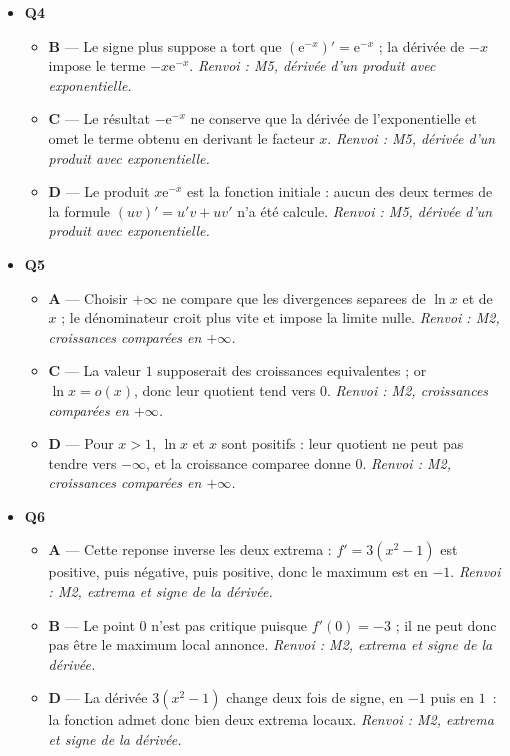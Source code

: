 \begin{itemize}
  \item \textbf{Q4}
  \begin{itemize}
    \item \textbf{B} — Le signe plus suppose a tort que $(\mathrm{e}^{-x})'=\mathrm{e}^{-x}$ ; la dérivée de $-x$ impose le terme $-x\mathrm{e}^{-x}$. \emph{Renvoi : M5, dérivée d'un produit avec exponentielle.}
    \item \textbf{C} — Le résultat $-\mathrm{e}^{-x}$ ne conserve que la dérivée de l'exponentielle et omet le terme obtenu en derivant le facteur $x$. \emph{Renvoi : M5, dérivée d'un produit avec exponentielle.}
    \item \textbf{D} — Le produit $x\mathrm{e}^{-x}$ est la fonction initiale : aucun des deux termes de la formule $(uv)'=u'v+uv'$ n'a été calcule. \emph{Renvoi : M5, dérivée d'un produit avec exponentielle.}
  \end{itemize}
  \item \textbf{Q5}
  \begin{itemize}
    \item \textbf{A} — Choisir $+\infty$ ne compare que les divergences separees de $\ln x$ et de $x$ ; le dénominateur croit plus vite et impose la limite nulle. \emph{Renvoi : M2, croissances comparées en $+\infty$.}
    \item \textbf{C} — La valeur $1$ supposerait des croissances equivalentes ; or $\ln x=o(x)$, donc leur quotient tend vers $0$. \emph{Renvoi : M2, croissances comparées en $+\infty$.}
    \item \textbf{D} — Pour $x>1$, $\ln x$ et $x$ sont positifs : leur quotient ne peut pas tendre vers $-\infty$, et la croissance comparee donne $0$. \emph{Renvoi : M2, croissances comparées en $+\infty$.}
  \end{itemize}
  \item \textbf{Q6}
  \begin{itemize}
    \item \textbf{A} — Cette reponse inverse les deux extrema : $f'=3(x^2-1)$ est positive, puis négative, puis positive, donc le maximum est en $-1$. \emph{Renvoi : M2, extrema et signe de la dérivée.}
    \item \textbf{B} — Le point $0$ n'est pas critique puisque $f'(0)=-3$ ; il ne peut donc pas être le maximum local annonce. \emph{Renvoi : M2, extrema et signe de la dérivée.}
    \item \textbf{D} — La dérivée $3(x^2-1)$ change deux fois de signe, en $-1$ puis en $1$ : la fonction admet donc bien deux extrema locaux. \emph{Renvoi : M2, extrema et signe de la dérivée.}

\end{itemize}
\end{itemize}
